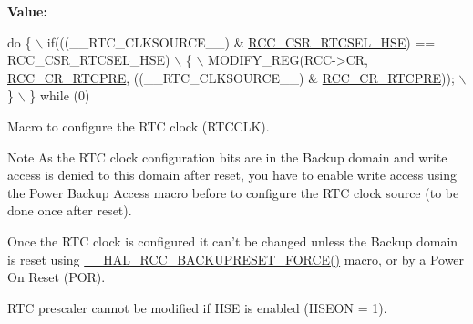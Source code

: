 {\bfseries Value\-:}
\begin{DoxyCode}
\textcolor{keywordflow}{do} \{ \(\backslash\)
            if(((\_\_RTC\_CLKSOURCE\_\_) & \hyperlink{group___peripheral___registers___bits___definition_ga63cfa8b19f84b2018e49afb4c69a76da}{RCC\_CSR\_RTCSEL\_HSE}) == RCC\_CSR\_RTCSEL\_HSE)         
       \(\backslash\)
            \{                                                                             \(\backslash\)
              MODIFY\_REG(RCC->CR, \hyperlink{group___peripheral___registers___bits___definition_gaf5cb8ce29ab0c579e788999c96f34db3}{RCC\_CR\_RTCPRE}, ((\_\_RTC\_CLKSOURCE\_\_) & 
      \hyperlink{group___peripheral___registers___bits___definition_gaf5cb8ce29ab0c579e788999c96f34db3}{RCC\_CR\_RTCPRE}));  \(\backslash\)
            \}                                                                             \(\backslash\)
          \} \textcolor{keywordflow}{while} (0)
\end{DoxyCode}


Macro to configure the R\-T\-C clock (R\-T\-C\-C\-L\-K). 

\begin{DoxyNote}{Note}
As the R\-T\-C clock configuration bits are in the Backup domain and write access is denied to this domain after reset, you have to enable write access using the Power Backup Access macro before to configure the R\-T\-C clock source (to be done once after reset). 

Once the R\-T\-C clock is configured it can't be changed unless the Backup domain is reset using \hyperlink{group___r_c_c___r_t_c___clock___configuration_ga3bf7da608ff985873ca8e248fb1dc4f0}{\-\_\-\-\_\-\-H\-A\-L\-\_\-\-R\-C\-C\-\_\-\-B\-A\-C\-K\-U\-P\-R\-E\-S\-E\-T\-\_\-\-F\-O\-R\-C\-E()} macro, or by a Power On Reset (P\-O\-R). 

R\-T\-C prescaler cannot be modified if H\-S\-E is enabled (H\-S\-E\-O\-N = 1).
\end{DoxyNote}

